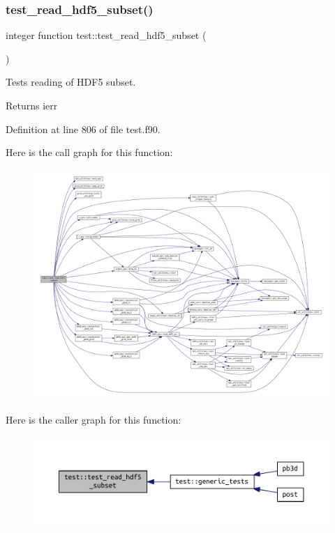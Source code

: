 \subsubsection{\texorpdfstring{test\+\_\+read\+\_\+hdf5\+\_\+subset()}{test\_read\_hdf5\_subset()}}
{\footnotesize\ttfamily integer function test\+::test\+\_\+read\+\_\+hdf5\+\_\+subset (\begin{DoxyParamCaption}{ }\end{DoxyParamCaption})}



Tests reading of H\+D\+F5 subset. 

\begin{DoxyReturn}{Returns}
ierr 
\end{DoxyReturn}


Definition at line 806 of file test.\+f90.

Here is the call graph for this function\+:
\nopagebreak
\begin{figure}[H]
\begin{center}
\leavevmode
\includegraphics[width=350pt]{namespacetest_ac574f08ba400cd61070a6a6f13f6f7ee_cgraph}
\end{center}
\end{figure}
Here is the caller graph for this function\+:\nopagebreak
\begin{figure}[H]
\begin{center}
\leavevmode
\includegraphics[width=350pt]{namespacetest_ac574f08ba400cd61070a6a6f13f6f7ee_icgraph}
\end{center}
\end{figure}
\mbox{\label{namespacetest_a53c6b3d654d4577af301fe3b04473d6a}} 
